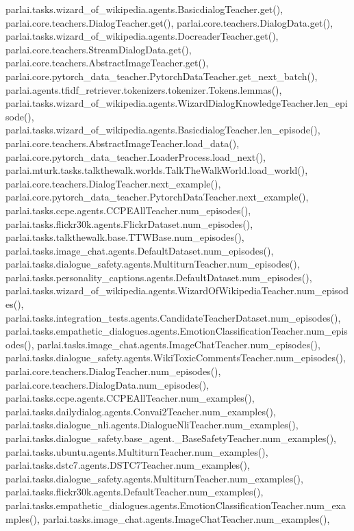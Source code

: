 parlai.\+tasks.\+wizard\+\_\+of\+\_\+wikipedia.\+agents.\+Basicdialog\+Teacher.\+get(), parlai.\+core.\+teachers.\+Dialog\+Teacher.\+get(), parlai.\+core.\+teachers.\+Dialog\+Data.\+get(), parlai.\+tasks.\+wizard\+\_\+of\+\_\+wikipedia.\+agents.\+Docreader\+Teacher.\+get(), parlai.\+core.\+teachers.\+Stream\+Dialog\+Data.\+get(), parlai.\+core.\+teachers.\+Abstract\+Image\+Teacher.\+get(), parlai.\+core.\+pytorch\+\_\+data\+\_\+teacher.\+Pytorch\+Data\+Teacher.\+get\+\_\+next\+\_\+batch(), parlai.\+agents.\+tfidf\+\_\+retriever.\+tokenizers.\+tokenizer.\+Tokens.\+lemmas(), parlai.\+tasks.\+wizard\+\_\+of\+\_\+wikipedia.\+agents.\+Wizard\+Dialog\+Knowledge\+Teacher.\+len\+\_\+episode(), parlai.\+tasks.\+wizard\+\_\+of\+\_\+wikipedia.\+agents.\+Basicdialog\+Teacher.\+len\+\_\+episode(), parlai.\+core.\+teachers.\+Abstract\+Image\+Teacher.\+load\+\_\+data(), parlai.\+core.\+pytorch\+\_\+data\+\_\+teacher.\+Loader\+Process.\+load\+\_\+next(), parlai.\+mturk.\+tasks.\+talkthewalk.\+worlds.\+Talk\+The\+Walk\+World.\+load\+\_\+world(), parlai.\+core.\+teachers.\+Dialog\+Teacher.\+next\+\_\+example(), parlai.\+core.\+pytorch\+\_\+data\+\_\+teacher.\+Pytorch\+Data\+Teacher.\+next\+\_\+example(), parlai.\+tasks.\+ccpe.\+agents.\+C\+C\+P\+E\+All\+Teacher.\+num\+\_\+episodes(), parlai.\+tasks.\+flickr30k.\+agents.\+Flickr\+Dataset.\+num\+\_\+episodes(), parlai.\+tasks.\+talkthewalk.\+base.\+T\+T\+W\+Base.\+num\+\_\+episodes(), parlai.\+tasks.\+image\+\_\+chat.\+agents.\+Default\+Dataset.\+num\+\_\+episodes(), parlai.\+tasks.\+dialogue\+\_\+safety.\+agents.\+Multiturn\+Teacher.\+num\+\_\+episodes(), parlai.\+tasks.\+personality\+\_\+captions.\+agents.\+Default\+Dataset.\+num\+\_\+episodes(), parlai.\+tasks.\+wizard\+\_\+of\+\_\+wikipedia.\+agents.\+Wizard\+Of\+Wikipedia\+Teacher.\+num\+\_\+episodes(), parlai.\+tasks.\+integration\+\_\+tests.\+agents.\+Candidate\+Teacher\+Dataset.\+num\+\_\+episodes(), parlai.\+tasks.\+empathetic\+\_\+dialogues.\+agents.\+Emotion\+Classification\+Teacher.\+num\+\_\+episodes(), parlai.\+tasks.\+image\+\_\+chat.\+agents.\+Image\+Chat\+Teacher.\+num\+\_\+episodes(), parlai.\+tasks.\+dialogue\+\_\+safety.\+agents.\+Wiki\+Toxic\+Comments\+Teacher.\+num\+\_\+episodes(), parlai.\+core.\+teachers.\+Dialog\+Teacher.\+num\+\_\+episodes(), parlai.\+core.\+teachers.\+Dialog\+Data.\+num\+\_\+episodes(), parlai.\+tasks.\+ccpe.\+agents.\+C\+C\+P\+E\+All\+Teacher.\+num\+\_\+examples(), parlai.\+tasks.\+dailydialog.\+agents.\+Convai2\+Teacher.\+num\+\_\+examples(), parlai.\+tasks.\+dialogue\+\_\+nli.\+agents.\+Dialogue\+Nli\+Teacher.\+num\+\_\+examples(), parlai.\+tasks.\+dialogue\+\_\+safety.\+base\+\_\+agent.\+\_\+\+Base\+Safety\+Teacher.\+num\+\_\+examples(), parlai.\+tasks.\+ubuntu.\+agents.\+Multiturn\+Teacher.\+num\+\_\+examples(), parlai.\+tasks.\+dstc7.\+agents.\+D\+S\+T\+C7\+Teacher.\+num\+\_\+examples(), parlai.\+tasks.\+dialogue\+\_\+safety.\+agents.\+Multiturn\+Teacher.\+num\+\_\+examples(), parlai.\+tasks.\+flickr30k.\+agents.\+Default\+Teacher.\+num\+\_\+examples(), parlai.\+tasks.\+empathetic\+\_\+dialogues.\+agents.\+Emotion\+Classification\+Teacher.\+num\+\_\+examples(), parlai.\+tasks.\+image\+\_\+chat.\+agents.\+Image\+Chat\+Teacher.\+num\+\_\+examples(), 